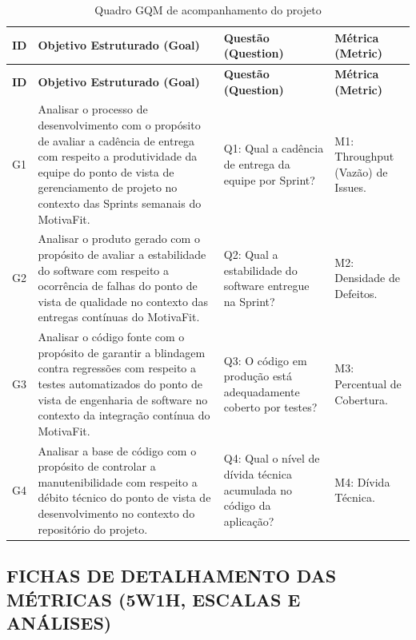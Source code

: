 \begingroup
\small
\setlength{\tabcolsep}{4pt}
\renewcommand{\arraystretch}{1.2}
\begin{longtable}{|>{\raggedright\arraybackslash}p{}|>{\raggedright\arraybackslash}p{}|>{\raggedright\arraybackslash}p{}|>{\raggedright\arraybackslash}p{}|}
\caption{Quadro GQM de acompanhamento do projeto}\\
\hline
\textbf{ID} & \textbf{Objetivo Estruturado (Goal)} & \textbf{Questão (Question)} & \textbf{Métrica (Metric)} \\ \hline
\endfirsthead
\textbf{ID} & \textbf{Objetivo Estruturado (Goal)} & \textbf{Questão (Question)} & \textbf{Métrica (Metric)} \\ \hline
\endhead
G1 & Analisar o processo de desenvolvimento com o propósito de avaliar a cadência de entrega com respeito a produtividade da equipe do ponto de vista de gerenciamento de projeto no contexto das Sprints semanais do MotivaFit. & Q1: Qual a cadência de entrega da equipe por Sprint? & M1: Throughput (Vazão) de Issues. \\ \hline
G2 & Analisar o produto gerado com o propósito de avaliar a estabilidade do software com respeito a ocorrência de falhas do ponto de vista de qualidade no contexto das entregas contínuas do MotivaFit. & Q2: Qual a estabilidade do software entregue na Sprint? & M2: Densidade de Defeitos. \\ \hline
G3 & Analisar o código fonte com o propósito de garantir a blindagem contra regressões com respeito a testes automatizados do ponto de vista de engenharia de software no contexto da integração contínua do MotivaFit. & Q3: O código em produção está adequadamente coberto por testes? & M3: Percentual de Cobertura. \\ \hline
G4 & Analisar a base de código com o propósito de controlar a manutenibilidade com respeito a débito técnico do ponto de vista de desenvolvimento no contexto do repositório do projeto. & Q4: Qual o nível de dívida técnica acumulada no código da aplicação? & M4: Dívida Técnica. \\ \hline
\end{longtable}
\endgroup

\subsection{FICHAS DE DETALHAMENTO DAS MÉTRICAS (5W1H, ESCALAS E ANÁLISES)}

